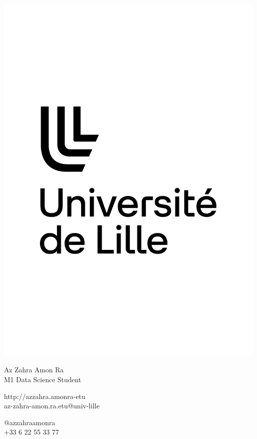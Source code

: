\documentclass{article}
\begin{document}
\centering
\includegraphics[width=.25\linewidth]{logo}\\[5pt] %

\parbox{2in}{\Large \centering Az Zahra Amon Ra\\[1pt]
\normalsize M1 Data Science Student}

\vfill

\raggedright
\begin{multicols}{2}
http://azzahra.amonra-etu\\
az-zahra-amon.ra.etu@univ-lille

\columnbreak
\raggedleft
@azzahraamonra\\
+33 6 22 55 33 77%
\end{multicols}%
\end{document}
